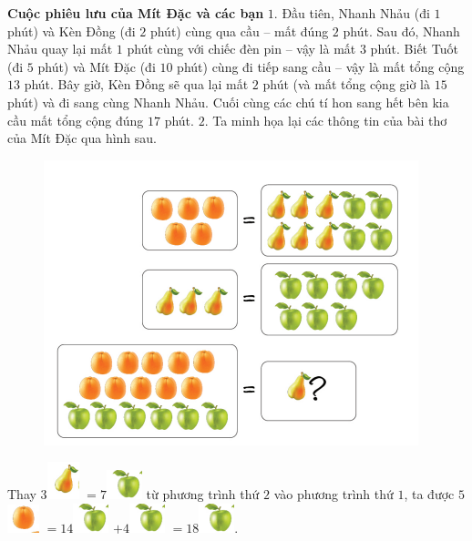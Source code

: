 \textbf{Cuộc phiêu lưu của Mít Đặc và các bạn}
\vskip 0.1cm
$1.$ Đầu tiên, Nhanh Nhảu (đi $1$ phút) và Kèn Đồng (đi $2$ phút) cùng qua cầu -- mất đúng $2$ phút. Sau đó, Nhanh Nhảu quay lại mất $1$ phút cùng với chiếc đèn pin -- vậy là mất $3$ phút. Biết Tuốt (đi $5$ phút) và Mít Đặc (đi $10$ phút) cùng đi tiếp sang cầu -- vậy là mất tổng cộng $13$ phút. Bây giờ, Kèn Đồng sẽ qua lại mất $2$ phút (và mất tổng cộng giờ là $15$ phút) và đi sang cùng Nhanh Nhảu. Cuối cùng các chú tí hon sang hết bên kia cầu mất tổng cộng đúng $17$ phút.
\vskip 0.1cm
$2.$ Ta minh họa lại các thông tin của bài thơ của Mít Đặc qua hình sau.
\begin{figure}[H]
	\centering
	\vspace*{-5pt}
	\captionsetup{labelformat= empty, justification=centering}
	\includegraphics[width=0.5\linewidth]{3}
	\vspace*{-15pt}
\end{figure}
Thay $3$\includegraphics{4}  $= 7$\includegraphics{5} từ phương trình thứ $2$ vào phương trình thứ $1$, ta được
\vskip 0.1cm
$5$\includegraphics{6}  $= 14$\includegraphics{5}  $+ 4$\includegraphics{5}  $= 18$\includegraphics{5}.
